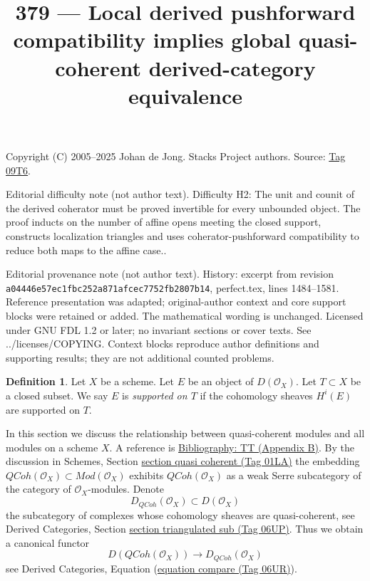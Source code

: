 \documentclass{amsart}
\theoremstyle{plain}
\theoremstyle{definition}
\newtheorem{definition}[subsection]{Definition}
\theoremstyle{remark}
\numberwithin{equation}{subsection}
\def\QCoh{\mathit{QCoh}}
\begin{document}
\title[Stacks Project, Tag 09T6]{379 --- Local derived pushforward compatibility implies global quasi-coherent derived-category equivalence}
\maketitle
\noindent Copyright (C) 2005--2025 Johan de Jong. Stacks Project authors. Source: \href{https://stacks.math.columbia.edu/tag/09T6}{Tag 09T6}.

\noindent Editorial difficulty note (not author text). Difficulty H2: The unit and counit of the derived coherator must be proved invertible for every unbounded object. The proof inducts on the number of affine opens meeting the closed support, constructs localization triangles and uses coherator-pushforward compatibility to reduce both maps to the affine case..

\noindent Editorial provenance note (not author text). History: excerpt from revision \texttt{a0444\allowbreak 6e57e\allowbreak c1fbc\allowbreak 252a8\allowbreak 71afc\allowbreak ec775\allowbreak 2fb28\allowbreak 07b14}, perfect.tex, lines 1484--1581. Reference presentation was adapted; original-author context and core support blocks were retained or added. The mathematical wording is unchanged. Licensed under GNU FDL 1.2 or later; no invariant sections or cover texts. See ../licenses/COPYING. Context blocks reproduce author definitions and supporting results; they are not additional counted problems.

\begin{definition}
\label{definition-supported-on}
Let $X$ be a scheme. Let $E$ be an object of $D(\mathcal{O}_X)$.
Let $T \subset X$ be a closed subset.
We say $E$ is {\it supported on $T$} if the
cohomology sheaves $H^i(E)$ are supported on $T$.
\end{definition}

\noindent
In this section we discuss the relationship between quasi-coherent
modules and all modules on a scheme $X$. A reference is
\href{https://stacks.math.columbia.edu/bibliography}{Bibliography: TT (Appendix B)}. By the discussion in
Schemes, Section \href{https://stacks.math.columbia.edu/tag/01LA}{section quasi coherent (Tag 01LA)}
the embedding
$\QCoh(\mathcal{O}_X) \subset \textit{Mod}(\mathcal{O}_X)$
exhibits $\QCoh(\mathcal{O}_X)$ as a weak Serre subcategory of
the category of $\mathcal{O}_X$-modules. Denote
$$
D_\QCoh(\mathcal{O}_X) \subset D(\mathcal{O}_X)
$$
the subcategory of complexes whose cohomology sheaves are quasi-coherent, see
Derived Categories, Section \href{https://stacks.math.columbia.edu/tag/06UP}{section triangulated sub (Tag 06UP)}.
Thus we obtain a canonical functor
\begin{equation}
\label{equation-compare}
D(\QCoh(\mathcal{O}_X))
\longrightarrow
D_\QCoh(\mathcal{O}_X)
\end{equation}
see Derived Categories, Equation (\href{https://stacks.math.columbia.edu/tag/06UR}{equation compare (Tag 06UR)}).
\end{document}
